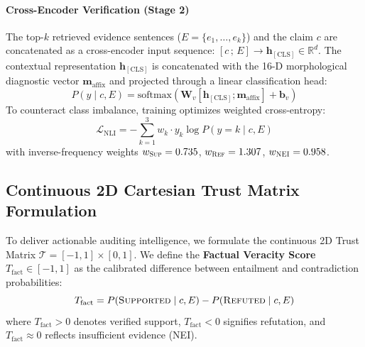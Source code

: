 \paragraph{Cross-Encoder Verification (Stage 2)}
The top-$k$ retrieved evidence sentences ($E = \{e_1, \dots, e_k\}$) and the claim $c$ are concatenated as a cross-encoder input sequence: $[c \,;\, E] \to \mathbf{h}_{[\text{CLS}]} \in \mathbb{R}^d$. The contextual representation $\mathbf{h}_{[\text{CLS}]}$ is concatenated with the 16-D morphological diagnostic vector $\mathbf{m}_{\text{affix}}$ and projected through a linear classification head:
\begin{equation}
    P(y \mid c, E) = \text{softmax}\left(\mathbf{W}_v \left[\mathbf{h}_{[\text{CLS}]}; \mathbf{m}_{\text{affix}}\right] + \mathbf{b}_v\right)
\end{equation}
To counteract class imbalance, training optimizes weighted cross-entropy:
\begin{equation}
    \mathcal{L}_{\text{NLI}} = - \sum_{k=1}^3 w_k \cdot y_k \log P(y = k \mid c, E)
\end{equation}
with inverse-frequency weights $w_{\textsc{Sup}} = 0.735$, $w_{\textsc{Ref}} = 1.307$, $w_{\textsc{NEI}} = 0.958$.

\subsection{Continuous 2D Cartesian Trust Matrix Formulation}
To deliver actionable auditing intelligence, we formulate the continuous 2D Trust Matrix $\mathcal{T} = [-1, 1] \times [0, 1]$. We define the \textbf{Factual Veracity Score} $T_{\text{fact}} \in [-1, 1]$ as the calibrated difference between entailment and contradiction probabilities:
\begin{equation}
    T_{\text{fact}} = P(\textsc{Supported} \mid c, E) - P(\textsc{Refuted} \mid c, E)
\end{equation}
where $T_{\text{fact}} > 0$ denotes verified support, $T_{\text{fact}} < 0$ signifies refutation, and $T_{\text{fact}} \approx 0$ reflects insufficient evidence (\textsc{NEI}).

